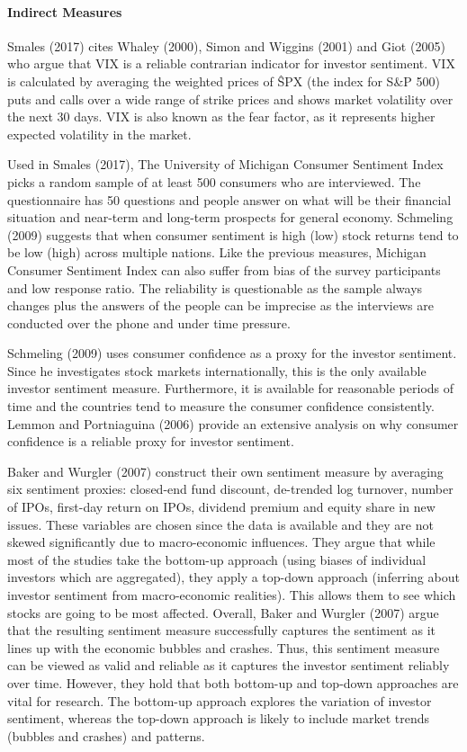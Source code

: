 \paragraph{Indirect Measures}
Smales (2017) cites Whaley (2000), Simon and Wiggins (2001) and Giot (2005) who argue that VIX is a reliable contrarian indicator for investor sentiment. VIX is calculated by averaging the weighted prices of \^SPX (the index for S\&P 500) puts and calls over a wide range of strike prices and shows market volatility over the next 30 days. VIX is also known as the fear factor, as it represents higher expected volatility in the market. 
\par
Used in Smales (2017), The University of Michigan Consumer Sentiment Index picks a random sample of at least 500 consumers who are interviewed. The questionnaire has 50 questions and people answer on what will be their financial situation and near-term and long-term prospects for general economy. Schmeling (2009) suggests that when consumer sentiment is high (low) stock returns tend to be low (high) across multiple nations. Like the previous measures, Michigan Consumer Sentiment Index can also suffer from bias of the survey participants and low response ratio. The reliability is questionable as the sample always changes plus the answers of the people can be imprecise as the interviews are conducted over the phone and under time pressure.
\par
Schmeling (2009) uses consumer confidence as a proxy for the investor sentiment. Since he investigates stock markets internationally, this is the only available investor sentiment measure. Furthermore, it is available for reasonable periods of time and the countries tend to measure the consumer confidence consistently. Lemmon and Portniaguina (2006) provide an extensive analysis on why consumer confidence is a reliable proxy for investor sentiment.
\par
Baker and Wurgler (2007) construct their own sentiment measure by averaging six sentiment proxies: closed-end fund discount, de-trended log turnover, number of IPOs, first-day return on IPOs, dividend premium and equity share in new issues. These variables are chosen since the data is available and they are not skewed significantly due to macro-economic influences. They argue that while most of the studies take the bottom-up approach (using biases of individual investors which are aggregated), they apply a top-down approach (inferring about investor sentiment from macro-economic realities). This allows them to see which stocks are going to be most affected. Overall, Baker and Wurgler (2007) argue that the resulting sentiment measure successfully captures the sentiment as it lines up with the economic bubbles and crashes. Thus, this sentiment measure can be viewed as valid and reliable as it captures the investor sentiment reliably over time. However, they hold that both bottom-up and top-down approaches are vital for research. The bottom-up approach explores the variation of investor sentiment, whereas the top-down approach is likely to include market trends (bubbles and crashes) and patterns.
